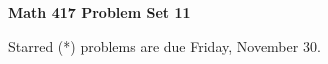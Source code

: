 \documentclass[12pt]{article}
\begin{document}
\def\ctln{\centerline}
\def\msk{\medskip}
\def\bsk{\bigskip}
\def\ssk{\smallskip}
\def\hsk{\hskip.3in}
\def\ra{\rightarrow}
\def\ubr{\underbar}

\def\mt{{\mathcal T}}
\def\mb{{\mathcal B}}
\def\ms{{\mathcal S}}
\def\mu{{\mathcal U}}
\def\mv{{\mathcal V}}

\def\bbr{{\mathbb R}}
\def\bbz{{\mathbb Z}}
\def\bbq{{\mathbb Q}}
\def\spc{$~$\hskip.15in$~$}

\def\sset{\subseteq}
\def\del{\partial}
\def\lra{$\Leftrightarrow$}
\def\bra{$\Rightarrow$}




\ctln{\bf Math 417 Problem Set 11}

\msk

Starred (*) problems are due Friday, November 30.
\end{document}
